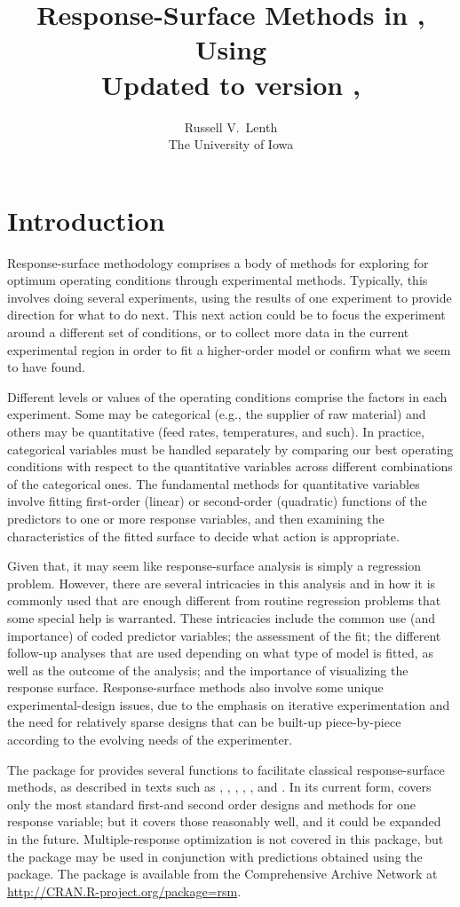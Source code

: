 \documentclass[article,nojss]{jss}
\author{Russell V.~Lenth\\The University of Iowa}
\title{Response-Surface Methods in \proglang{R}, Using \pkg{rsm}\\
\normalsize Updated to version \VERSION, \DATE}
\def\rsm{\pkg{rsm}}
\def\R{\proglang{R}}
\begin{document}
\section{Introduction}
Response-surface methodology comprises a body of methods for exploring for optimum operating conditions through experimental methods.  Typically, this involves doing several experiments, using the results of one experiment to provide direction for what to do next.  This next action could be to focus the experiment around a different set of conditions, or to collect more data in the current experimental region in order to fit a higher-order model or confirm what we seem to have found.  

Different levels or values of the operating conditions comprise the factors in each experiment.  Some may be categorical (e.g., the supplier of raw material) and others may be quantitative (feed rates, temperatures, and such).  In practice, categorical variables must be handled separately by comparing our best operating conditions with respect to the quantitative variables across different combinations of the categorical ones.  The fundamental methods for quantitative variables involve fitting first-order (linear) or second-order (quadratic) functions of the predictors to one or more response variables, and then examining the characteristics of the fitted surface to decide what action is appropriate.

Given that, it may seem like response-surface analysis is simply a regression problem.  However, there are several intricacies in this analysis and in how it is commonly used that are enough different from routine regression problems that some special help is warranted.  These intricacies include the common use (and importance) of coded predictor variables; the assessment of the fit; the different follow-up analyses that are used depending on what type of model is fitted, as well as the outcome of the analysis; and the importance of visualizing the response surface.  Response-surface methods also involve some unique experimental-design issues, due to the emphasis on iterative experimentation and the need for relatively sparse designs that can be built-up piece-by-piece according to the evolving needs of the experimenter.

The \rsm{} package for \R{} \citep{R} provides several functions to facilitate classical response-surface methods, as
described in texts such as \cite{Box87}, \citet[Chapters~1--5]{Khu96}, \citet[Chapter~9]{Wu00}, \cite{Mye09},
\citet[Chapters~11--12]{Box05}, and \citet[Chapter~10]{Ryan07}.  In its current form, \rsm{} covers only the
most standard first-and second order designs and methods for one response variable; but it covers those
reasonably well, and it could be expanded in the future.  Multiple-response optimization is not covered
in this package, but the  package \cite[]{Kuh09} may be used in conjunction with
predictions obtained using the \rsm{} package. The \rsm{} package is available from the Comprehensive
 Archive Network at \url{http://CRAN.R-project.org/package=rsm}.
\end{document}
